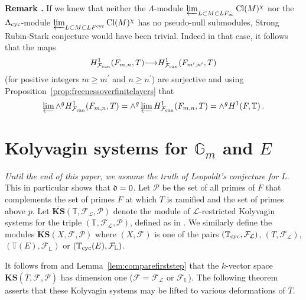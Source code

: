 \documentclass[12pt]{amsart}
\numberwithin{equation}{section}
\newenvironment{rem}{\par\medskip\noindent\refstepcounter{thm}
\bgroup{\hspace*{-0.15 cm}\bf{Remark} \thethm.}\bgroup}{\egroup
\egroup\par\medskip} \parskip 2pt
\begin{document}
\begin{rem}
\label{rem:strongequivtoordinaryRS}
If we knew that neither the ${\Lambda}$-module ${\varprojlim_{L\subset M\subset LF_\infty}\textup{Cl}(M)^\chi}$ nor the ${\Lambda}_{\textup{cyc}}$-module ${\varprojlim_{L\subset M\subset LF^{\textup{cyc}}}\textup{Cl}(M)^\chi}$ has no pseudo-null submodules, Strong Rubin-Stark conjecture would have been trivial. Indeed in that case,  it follows that the maps 
$$H^1_{\mathcal{F}_{\textup{\lowercase{can}}}}(F_{m,n},T){\longrightarrow} H^1_{\mathcal{F}_{\textup{\lowercase{can}}}}(F_{m^\prime,n^\prime},T)$$
(for positive integers $m\geq m^\prime$ and $n\geq n^\prime$) are surjective and using Proposition~\ref{prop:freenessoverfinitelayers} that 
$$\varprojlim \wedge^g H^1_{\mathcal{F}_{\textup{\lowercase{can}}}}(F_{m,n},T)=\wedge^g \varprojlim H^1_{\mathcal{F}_{\textup{\lowercase{can}}}}(F_{m,n},T)=\wedge^g H^1(F,{\mathbb{T}})\,.$$
\end{rem}
\section{Kolyvagin systems for $\mathbb{G}_m$ and $E$}
\label{Sec:KSforGmandE}
\emph{Until the end of this paper, we assume the truth of Leopoldt's conjecture for $L$}. This in particular shows that $\frak{d}=0$. Let ${\mathcal{P}}$ be the set of all primes of $F$ that complements the set of primes $F$ at which $T$ is ramified and the set of primes above $p$. Let $\overline{\mathbf{KS}}({\mathbb{T}},{\mathcal{F}}_{\mathcal{L}},{\mathcal{P}})$ denote the module of ${\mathcal{L}}$-restricted Kolyvagin systems for the triple $({\mathbb{T}},{\mathcal{F}}_{\mathcal{L}},{\mathcal{P}})$, defined as in \cite[Definition A.12]{kbbCMabvar}. We similarly define the modules $\overline{\mathbf{KS}}(X,{\mathcal{F}},{\mathcal{P}})$ where $(X,{\mathcal{F}})$ is one of the pairs $({\mathbb{T}}_{\textup{cyc}},{\mathcal{F}}_{\mathcal{L}})$, $(T,{\mathcal{F}}_{\mathcal{L}})$, $({\mathbb{T}}(E),{\mathcal{F}}_{\mathbb{L}})$ or $({\mathbb{T}}_{\textup{cyc}}(E),{\mathcal{F}}_{\mathbb{L}})$. 

It follows from \cite[Theorem 5.1.1]{mr02} and Lemma~\ref{lem:comparefirststep} that the $k$-vector space ${\mathbf{KS}}(\overline{T},{\mathcal{F}},{\mathcal{P}})$ has dimension one (${\mathcal{F}}={\mathcal{F}}_{\mathcal{L}}$ or $\mathbb{{\mathcal{F}}_\mathbb{L}}$). The following theorem asserts that these Kolyvagin systems may be lifted to various deformations of $\overline{T}$.
\end{document}
